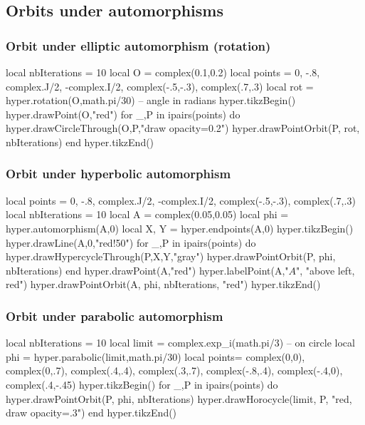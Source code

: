 \documentclass{article}
\begin{document}
\subsection{Orbits under automorphisms}


\subsubsection{Orbit under elliptic automorphism (rotation)}
\begin{codeandresult}
\begin{luacode*}
local nbIterations = 10
local O = complex(0.1,0.2)
local points = {0, -.8, complex.J/2, -complex.I/2, complex(-.5,-.3), complex(.7,.3)}
local rot = hyper.rotation(O,math.pi/30) -- angle in radians
hyper.tikzBegin()
hyper.drawPoint(O,"red")
for _,P in ipairs(points) do
	hyper.drawCircleThrough(O,P,"draw opacity=0.2")
	hyper.drawPointOrbit(P, rot, nbIterations) 
end
hyper.tikzEnd()
\end{luacode*}
\end{codeandresult}


\subsubsection{Orbit under hyperbolic automorphism}
\begin{codeandresult}
\begin{luacode*}
local points = {0, -.8, complex.J/2, -complex.I/2, complex(-.5,-.3), complex(.7,.3)}
local nbIterations = 10
local A = complex(0.05,0.05)
local phi = hyper.automorphism(A,0)
local X, Y = hyper.endpoints(A,0)
hyper.tikzBegin()
hyper.drawLine(A,0,"red!50")
for _,P in ipairs(points) do
	hyper.drawHypercycleThrough(P,X,Y,"gray")
	hyper.drawPointOrbit(P, phi, nbIterations) 
end
hyper.drawPoint(A,"red")
hyper.labelPoint(A,"$A$", "above left, red")
hyper.drawPointOrbit(A, phi, nbIterations, "red") 
hyper.tikzEnd()
\end{luacode*}
\end{codeandresult}


\subsubsection{Orbit under parabolic automorphism}
\begin{codeandresult}
\begin{luacode*}
local nbIterations = 10
local limit = complex.exp_i(math.pi/3) -- on circle
local phi = hyper.parabolic(limit,math.pi/30)
local points={
	complex(0,0), complex(0,.7),
	complex(.4,.4), complex(.3,.7),
	complex(-.8,.4), complex(-.4,0),
	complex(.4,-.45)}
hyper.tikzBegin()
for _,P in ipairs(points) do
	hyper.drawPointOrbit(P, phi, nbIterations) 
	hyper.drawHorocycle(limit, P, "red, draw opacity=.3")
end
hyper.tikzEnd()
\end{luacode*}
\end{codeandresult}
\end{document}
